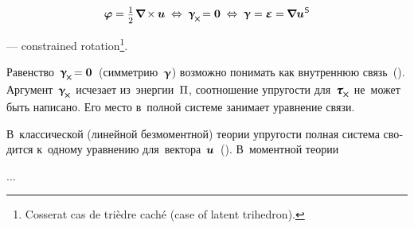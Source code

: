 \nopagebreak\vspace{-0.15em}\begin{equation}
\fieldofrotations = \smalldisplaystyleonehalf \hspace{.2ex} \boldnabla \hspace{-0.16ex} \times \hspace{-0.1ex} \fieldofdisplacements
\hspace{.6ex}\Leftrightarrow\hspace{.6ex}
\distortiontensor_{\hspace{-0.25ex}\Xcompanion} \hspace{-0.32ex} = \zerovector
\hspace{.6ex}\Leftrightarrow\hspace{.6ex}
\distortiontensor = \infinitesimaldeformation = \hspace{-0.12ex} \boldnabla {\fieldofdisplacements}^{\hspace{.1ex}\mathsf{S}}
\end{equation}

\vspace{-0.2em}\noindent
---  constrained rotation\ru{)}\footnote{Cosserat  cas de trièdre caché (case of latent trihedron).}\hspace{-0.32em}.

\begin{otherlanguage}{russian}

Равенство~${\distortiontensor_{\hspace{-0.25ex}\Xcompanion} \hspace{-0.32ex} = \zerovector}$~(симметрию~$\bm{\upgamma}$) возможно понимать как внутреннюю связь~().
Аргумент~${\distortiontensor_{\hspace{-0.25ex}\Xcompanion}}$ исчезает из~энергии~$\Pi$, соотношение упругости для~${\forcestresstensor_{\hspace{-0.1ex}\Xcompanion}}$ не~может быть написано.
Его место в~полной системе занимает уравнение связи.

В~классической (линейной безмоментной) теории упругости полная система сводится к~одному уравнению для~вектора~$\bm{u}$~().
В~моментной теории

...



\end{otherlanguage}


